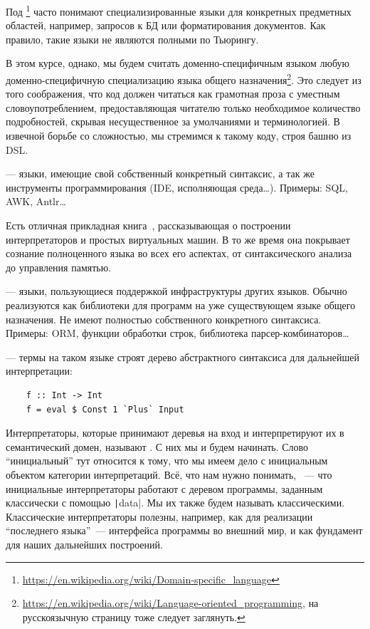 Под \footnote{\url{https://en.wikipedia.org/wiki/Domain-specific_language}} часто понимают специализированные языки для конкретных предметных областей, например, запросов к БД или форматирования документов.
Как правило, такие языки не являются полными по Тьюрингу.

В этом курсе, однако, мы будем считать доменно-специфичным языком любую доменно-специфичную специализацию языка общего назначения\footnote{\url{https://en.wikipedia.org/wiki/Language-oriented_programming}, на русскоязычную страницу тоже следует заглянуть.}.
Это следует из того соображения, что код должен читаться как грамотная проза с уместным словоупотреблением, предоставляющая читателю только необходимое количество подробностей, скрывая несущественное за умолчаниями и терминологией.
В извечной борьбе со сложностью, мы стремимся к такому коду, строя башню из DSL\@.

 --- языки, имеющие свой собственный конкретный синтаксис, а так же инструменты программирования (IDE, исполняющая среда\ldots).
Примеры: SQL, AWK, Antlr\ldots

Есть отличная прикладная книга~\cite{nystrom2021crafting}, рассказывающая о построении интерпретаторов и простых виртуальных машин.
В то же время она покрывает сознание полноценного языка во всех его аспектах, от синтаксического анализа до управления памятью.

 --- языки, пользующиеся поддержкой инфраструктуры других языков.
Обычно реализуются как библиотеки для программ на уже существующем языке общего назначения.
Не имеют полностью собственного конкретного синтаксиса.
Примеры: ORM, функции обработки строк, библиотека парсер-комбинаторов\ldots

 --- термы на таком языке строят дерево абстрактного синтаксиса для дальнейшей интерпретации:
\begin{verbatim}
    f :: Int -> Int
    f = eval $ Const 1 `Plus` Input
\end{verbatim}

Интерпретаторы, которые принимают деревья на вход и интерпретируют их в семантический домен, называют .
С них мы и будем начинать.
Слово ``инициальный'' тут относится к тому, что мы имеем дело с инициальным объектом категории интерпретаций.
Всё, что нам нужно понимать, ~--- что инициальные интерпретаторы работают с деревом программы, заданным классически с помощью \texttt|data|.
Мы их также будем называть классическими.
Классические интерпретаторы полезны, например, как для реализации ``последнего языка''~--- интерфейса программы во внешний мир, и как фундамент для наших дальнейших построений.

